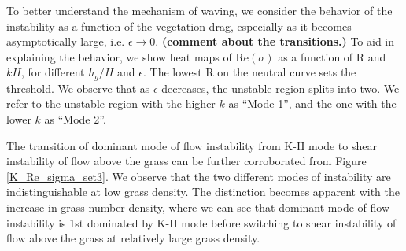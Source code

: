 \documentclass[aps,prl,twocolumn,showpacs,superscriptaddress,groupedaddress,10pt]{revtex4-1}  %
\newcommand{\hg}{h_g}
\newcommand{\Rey}{\text{R}}
\newcommand{\shreyas}[1]{{\bf (#1)}}
\begin{document}
To better understand the mechanism of waving, we consider the behavior of the instability as a function of the vegetation drag, especially as it becomes asymptotically large, i.e. $\epsilon \to 0$. \shreyas{comment about the transitions.} To aid in explaining the behavior, we show heat maps of Re$(\sigma)$ as a function of $\Rey$ and $kH$, for different $\hg/H$ and $\epsilon$. The lowest $\Rey$ on the neutral curve sets the threshold. We observe that as $\epsilon$ decreases, the unstable region splits into two. We refer to the unstable region with the higher $k$ as ``Mode 1'', and the one with the lower $k$ as ``Mode 2''.  
 
The transition of dominant mode of flow instability from K-H mode to shear instability of flow above the grass can be further corroborated from Figure \ref{K_Re_sigma_set3}.
We observe that the two different modes of instability are indistinguishable at low grass density. The distinction becomes apparent with the increase in grass number density, where we 
can see that dominant mode of flow instability is 1st dominated by K-H mode before switching to shear instability of flow above the grass at relatively large grass density.  
\end{document}
